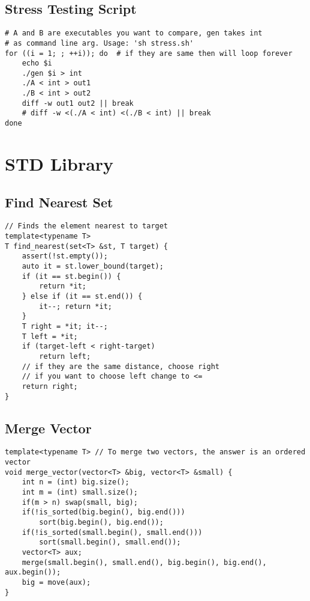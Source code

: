 \documentclass[10pt,letterpaper,twocolumn,twosided]{article}
\begin{document}
\subsection{Stress Testing Script}
\begin{lstlisting}
# A and B are executables you want to compare, gen takes int
# as command line arg. Usage: 'sh stress.sh'
for ((i = 1; ; ++i)); do  # if they are same then will loop forever
    echo $i
    ./gen $i > int
    ./A < int > out1
    ./B < int > out2
    diff -w out1 out2 || break
    # diff -w <(./A < int) <(./B < int) || break
done
\end{lstlisting}


\section{STD Library}

\subsection{Find Nearest Set}
\begin{lstlisting}
// Finds the element nearest to target
template<typename T>
T find_nearest(set<T> &st, T target) {
    assert(!st.empty());
    auto it = st.lower_bound(target);
    if (it == st.begin()) {
        return *it;
    } else if (it == st.end()) {
        it--; return *it;
    }
    T right = *it; it--;
    T left = *it;
    if (target-left < right-target) 
        return left;
    // if they are the same distance, choose right
    // if you want to choose left change to <=
    return right;
}
\end{lstlisting}


\subsection{Merge Vector}
\begin{lstlisting}
template<typename T> // To merge two vectors, the answer is an ordered vector
void merge_vector(vector<T> &big, vector<T> &small) {
    int n = (int) big.size();
    int m = (int) small.size();
    if(m > n) swap(small, big);
    if(!is_sorted(big.begin(), big.end()))
        sort(big.begin(), big.end());
    if(!is_sorted(small.begin(), small.end()))
        sort(small.begin(), small.end());
    vector<T> aux;
    merge(small.begin(), small.end(), big.begin(), big.end(), aux.begin());
    big = move(aux);
}
\end{lstlisting}
\end{document}
